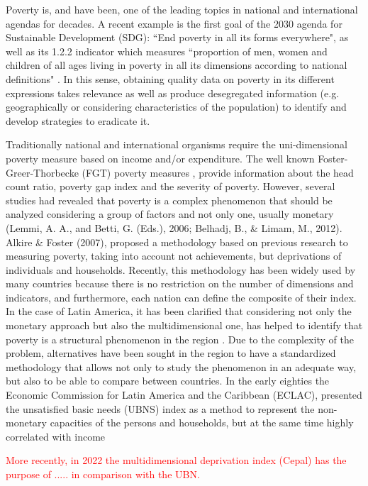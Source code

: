 \documentclass[a4paper, 11pt]{article}
\begin{document}
Poverty is, and have been, one of the leading topics in national and international agendas for decades. A recent example is the first goal of the 2030 agenda for Sustainable Development (SDG): ``End poverty in all its forms everywhere", as well as its 1.2.2 indicator which measures ``proportion of men, women and children of all ages living in poverty in all its dimensions according to national definitions" \citep{UnitedNationsGeneralAssembly2015ResDevelopment}. In this sense,  obtaining quality data on poverty in its different expressions takes relevance as well as produce desegregated information (e.g. geographically or considering characteristics of the population) to identify and develop strategies to eradicate it.  

Traditionally national and international organisms require the uni-dimensional poverty measure based on income and/or expenditure. The well known Foster-Greer-Thorbecke (FGT) poverty measures \citep{foster1984}, provide information about the head count ratio, poverty gap index and the severity of poverty. However, several studies had revealed that poverty is a complex phenomenon that should be analyzed considering a group of factors and not only one, usually monetary (Lemmi, A. A., and Betti, G. (Eds.), 2006; Belhadj, B., & Limam, M., 2012). Alkire & Foster (2007), proposed a methodology based on previous research to measuring poverty, taking into account not achievements, but deprivations of individuals and households. Recently, this methodology has been widely used by many countries because there is no restriction on the number of dimensions and indicators, and furthermore, each nation can define the composite of their index.
In the case of Latin America, it has been clarified that  considering not only the monetary approach but also the multidimensional one, has helped to identify that poverty is a structural phenomenon in the region \citep{CEPAL2014}. Due to the complexity of the problem, alternatives have been sought in the region to have a standardized methodology that allows not only to study the phenomenon in an adequate way, but also to be able to compare between countries. In the early eighties the Economic Commission for Latin America and the Caribbean (ECLAC), presented the unsatisfied basic needs (UBNS) index as a method to represent the non-monetary capacities of the persons and households, but at the same time highly correlated with income \citep{Mancero2001}

\textcolor{red}{More recently, in 2022 the multidimensional deprivation index (Cepal) has the purpose of ..... in comparison with the UBN.} 
\end{document}
